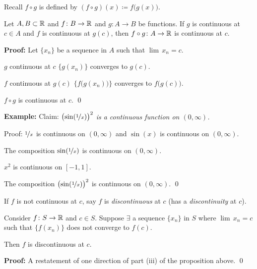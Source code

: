 \documentclass[10pt,aspectratio=149]{beamer}
\begin{document}
\begin{frame}

Recall $f \circ g$ is defined by
$(f \circ g)(x) \coloneqq f\bigl(g(x)\bigr)$.
\pause

\begin{proposition}
Let $A, B \subset {\mathbb{R}}$ and $f \colon B \to {\mathbb{R}}$ and $g \colon A \to B$ be
functions.  If $g$ is continuous at $c \in A$ and
$f$ is continuous at $g(c)$, then $f \circ g \colon A \to {\mathbb{R}}$ is continuous
at $c$.
\end{proposition}

\pause
\textbf{Proof:}
Let $\{ x_n \}$ be a sequence in $A$ such that $\lim\, x_n = c$.

\pause
$g$ continuous at $c$ \wthus $\bigl\{ g(x_n) \bigr\}$ converges to $g(c)$.

\pause
$f$ continuous at $g(c)$ \wthus $\bigl\{ f\bigl(g(x_n)\bigr) \bigr\}$ converges to $f\bigl(g(c)\bigr)$.

\pause
\thus \quad $f \circ g$ is continuous at $c$.
\qed

\pause
\medskip

\textbf{Example:}
Claim: \emph{${\bigl(\sin(\nicefrac{1}{x})\bigr)}^2$ is a continuous
function on $(0,\infty)$.}

\pause
\medskip

Proof: $\nicefrac{1}{x}$ is continuous on $(0,\infty)$
and $\sin(x)$ is continuous on $(0,\infty)$.

\pause
\thus \quad The composition $\sin(\nicefrac{1}{x})$ is continuous on
$(0,\infty)$.

\pause
$x^2$ is continuous on $[-1,1]$.

\pause
\thus \quad
The composition ${\bigl(\sin(\nicefrac{1}{x})\bigr)}^2$ is continuous on $(0,\infty)$.
\qed

\end{frame}

\begin{frame}
If $f$ is not continuous at $c$,
say $f$ is \emph{discontinuous} at $c$ (has a \emph{discontinuity} at $c$).

\pause
\begin{proposition}
Consider $f \colon S \to {\mathbb{R}}$ and $c \in S$.  Suppose 
$\exists$ a sequence $\{ x_n \}$ in $S$ where $\lim\, x_n = c$
such that $\bigl\{ f(x_n) \bigr\}$ does not converge to $f(c)$.

\pause
Then $f$ is 
discontinuous at $c$.
\end{proposition}

\pause
\textbf{Proof:} A restatement of one direction of part (iii) of the
proposition above.
\qed

\end{frame}
\end{document}
